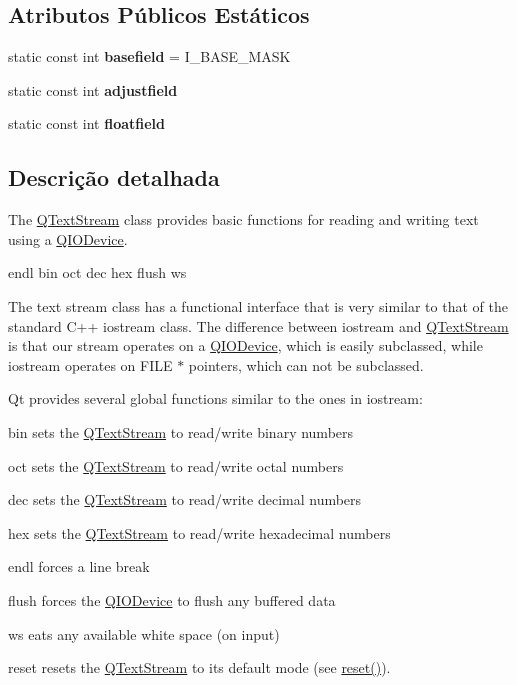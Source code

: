 \subsection*{Atributos Públicos Estáticos}
\begin{DoxyCompactItemize}
\item 
\hypertarget{class_q_text_stream_a6021d2a83082a9c421e2f467e685af9d}{static const int {\bfseries basefield} = I\-\_\-\-B\-A\-S\-E\-\_\-\-M\-A\-S\-K}\label{class_q_text_stream_a6021d2a83082a9c421e2f467e685af9d}

\item 
static const int {\bfseries adjustfield}
\item 
static const int {\bfseries floatfield}
\end{DoxyCompactItemize}


\subsection{Descrição detalhada}
The \hyperlink{class_q_text_stream}{Q\-Text\-Stream} class provides basic functions for reading and writing text using a \hyperlink{class_q_i_o_device}{Q\-I\-O\-Device}. 

endl  bin  oct  dec  hex  flush  ws

The text stream class has a functional interface that is very similar to that of the standard C++ iostream class. The difference between iostream and \hyperlink{class_q_text_stream}{Q\-Text\-Stream} is that our stream operates on a \hyperlink{class_q_i_o_device}{Q\-I\-O\-Device}, which is easily subclassed, while iostream operates on F\-I\-L\-E $\ast$ pointers, which can not be subclassed.

Qt provides several global functions similar to the ones in iostream\-: 
\begin{DoxyItemize}
\item {\ttfamily bin} sets the \hyperlink{class_q_text_stream}{Q\-Text\-Stream} to read/write binary numbers 
\item {\ttfamily oct} sets the \hyperlink{class_q_text_stream}{Q\-Text\-Stream} to read/write octal numbers 
\item {\ttfamily dec} sets the \hyperlink{class_q_text_stream}{Q\-Text\-Stream} to read/write decimal numbers 
\item {\ttfamily hex} sets the \hyperlink{class_q_text_stream}{Q\-Text\-Stream} to read/write hexadecimal numbers 
\item {\ttfamily endl} forces a line break 
\item {\ttfamily flush} forces the \hyperlink{class_q_i_o_device}{Q\-I\-O\-Device} to flush any buffered data 
\item {\ttfamily ws} eats any available white space (on input) 
\item {\ttfamily reset} resets the \hyperlink{class_q_text_stream}{Q\-Text\-Stream} to its default mode (see \hyperlink{class_q_text_stream_ad20897c5c8bd47f5d4005989bead0e55}{reset()}). 
\end{DoxyItemize}

